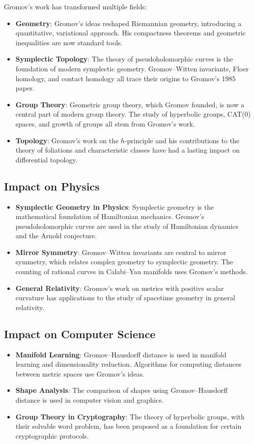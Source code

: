 Gromov's work has transformed multiple fields:
\begin{itemize}
\item \textbf{Geometry}: Gromov's ideas reshaped Riemannian geometry, introducing a quantitative, variational approach. His compactness theorems and geometric inequalities are now standard tools.
\item \textbf{Symplectic Topology}: The theory of pseudoholomorphic curves is the foundation of modern symplectic geometry. Gromov--Witten invariants, Floer homology, and contact homology all trace their origins to Gromov's 1985 paper.
\item \textbf{Group Theory}: Geometric group theory, which Gromov founded, is now a central part of modern group theory. The study of hyperbolic groups, CAT(0) spaces, and growth of groups all stem from Gromov's work.
\item \textbf{Topology}: Gromov's work on the $h$-principle and his contributions to the theory of foliations and characteristic classes have had a lasting impact on differential topology.
\end{itemize}

\subsection{Impact on Physics}

\begin{itemize}
\item \textbf{Symplectic Geometry in Physics}: Symplectic geometry is the mathematical foundation of Hamiltonian mechanics. Gromov's pseudoholomorphic curves are used in the study of Hamiltonian dynamics and the Arnold conjecture.
\item \textbf{Mirror Symmetry}: Gromov--Witten invariants are central to mirror symmetry, which relates complex geometry to symplectic geometry. The counting of rational curves in Calabi--Yau manifolds uses Gromov's methods.
\item \textbf{General Relativity}: Gromov's work on metrics with positive scalar curvature has applications to the study of spacetime geometry in general relativity.
\end{itemize}

\subsection{Impact on Computer Science}

\begin{itemize}
\item \textbf{Manifold Learning}: Gromov--Hausdorff distance is used in manifold learning and dimensionality reduction. Algorithms for computing distances between metric spaces use Gromov's ideas.
\item \textbf{Shape Analysis}: The comparison of shapes using Gromov--Hausdorff distance is used in computer vision and graphics.
\item \textbf{Group Theory in Cryptography}: The theory of hyperbolic groups, with their solvable word problem, has been proposed as a foundation for certain cryptographic protocols.
\end{itemize}

